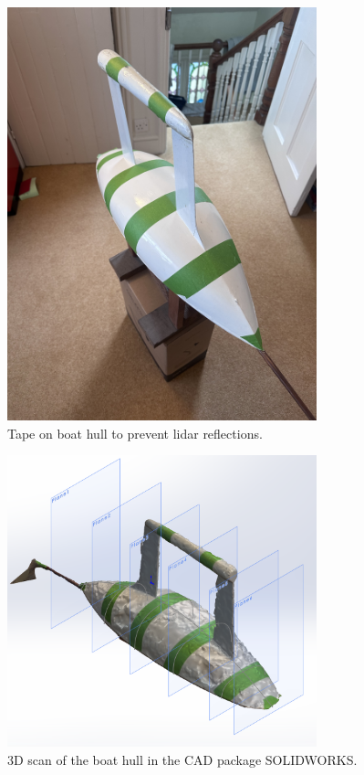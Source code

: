 \documentclass{article}
\begin{document}
\begin{figure}[H]
    \centering
    \includegraphics[width=0.8\textwidth]{figures/IMG_3011.jpg}
    \caption{Tape on boat hull to prevent lidar reflections.}
    \label{fig:lidar_tape}
\end{figure}

\begin{figure}[H]
    \centering
    \includegraphics[width=0.8\textwidth]{figures/2m8uCHP5jN.png}
    \caption{3D scan of the boat hull in the CAD package SOLIDWORKS.}
    \label{fig:3d_scan}
\end{figure}
\end{document}
